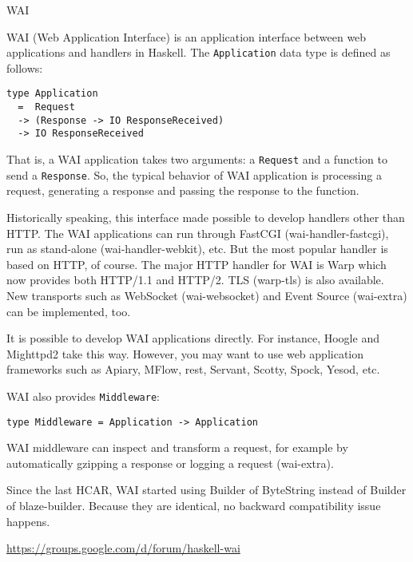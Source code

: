 \begin{hcarentry}{WAI}
\label{wai}
\makeheader

WAI (Web Application Interface) is an application interface between web
applications and handlers in Haskell. The \texttt{Application} data type is
defined as follows:

\begin{verbatim}
type Application
  =  Request
  -> (Response -> IO ResponseReceived)
  -> IO ResponseReceived
\end{verbatim}

That is, a WAI application takes two arguments: a \texttt{Request} and a
function to send a \texttt{Response}. So, the typical behavior of WAI
application is processing a request, generating a response and passing the
response to the function.

Historically speaking, this interface made possible to develop handlers other
than HTTP.  The WAI applications can run through FastCGI
(wai-handler-fastcgi), run as stand-alone (wai-handler-webkit), etc. But the
most popular handler is based on HTTP, of course. The major HTTP handler for
WAI is Warp which now provides both HTTP/1.1 and HTTP/2. TLS (warp-tls) is
also available. New transports such as WebSocket (wai-websocket) and Event
Source (wai-extra) can be implemented, too.

It is possible to develop WAI applications directly. For instance, Hoogle and
Mighttpd2 take this way. However, you may want to use web application
frameworks such as Apiary, MFlow, rest, Servant, Scotty, Spock, Yesod, etc.

WAI also provides \texttt{Middleware}:

\begin{verbatim}
type Middleware = Application -> Application
\end{verbatim}

WAI middleware can inspect and transform a request, for example by
automatically gzipping a response or logging a request (wai-extra).

Since the last HCAR, WAI started using Builder of ByteString instead of
Builder of blaze-builder. Because they are identical, no backward
compatibility issue happens.

\FurtherReading
\begin{compactitem}
\item\url{https://groups.google.com/d/forum/haskell-wai}
\end{compactitem}
\end{hcarentry}
